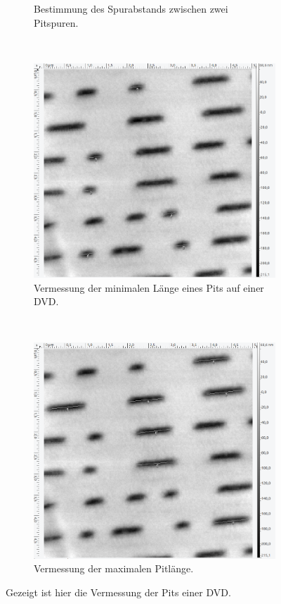 \begin{figure}[H]
\begin{subfigure}[t]{0.4\textwidth}
	\caption{Bestimmung des Spurabstands zwischen zwei Pitspuren.}
	\end{subfigure}
	\\
	\begin{subfigure}[t]{0.4\textwidth}
	\includegraphics[width=\textwidth]{AFM_auswertung/dvd_Lmin.png}
	\caption{Vermessung der minimalen L\"ange eines Pits auf einer DVD.}
	\end{subfigure}
	~
	\begin{subfigure}[t]{0.4\textwidth}
	\includegraphics[width=\textwidth]{AFM_auswertung/dvd_Lmax.png}
	\caption{Vermessung der maximalen Pitl\"ange.}
	\end{subfigure}
\caption{Gezeigt ist hier die Vermessung der Pits einer DVD.}
\label{abb:DVD}
\end{figure}


